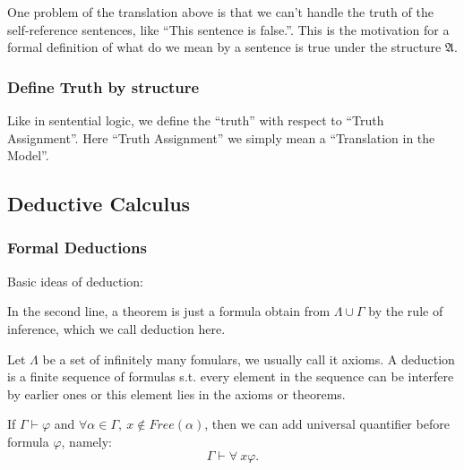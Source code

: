 \documentclass[11pt]{article}
\begin{document}
One problem of the translation above is that we can't handle the truth of the self-reference sentences, like ``This sentence is false.''. This is the motivation for a formal definition of what do we mean by a sentence is true under the structure \(\mathfrak{A}\).
\subsubsection{Define Truth by structure}
\label{sec:org4a3d5a2}
Like in sentential logic, we define the ``truth'' with respect to ``Truth Assignment''. Here ``Truth Assignment'' we simply mean a ``Translation in the Model''.
\subsection{Deductive Calculus}
\label{sec:org033c44d}
\subsubsection{Formal Deductions}
\label{sec:orgc68c25c}
Basic ideas of deduction:
\begin{center}\end{center}

In the second line, a theorem is just a formula obtain from \(\Lambda \cup \Gamma\) by the rule of inference, which we call deduction here.


\begin{definition}[Deduction]
Let \(\Lambda\) be a set of infinitely many fomulars, we usually call it axioms. A deduction is a finite sequence of formulas s.t. every element in the sequence can be interfere by earlier ones or this element lies in the axioms or theorems.
\end{definition}

\begin{theorem}
If \(\Gamma \vdash \varphi\) and \(\forall \alpha \in \Gamma, \ x \notin Free(\alpha)\), then we can add universal quantifier before formula \(\varphi\), namely:
\[
\Gamma \vdash \forall \ x \varphi.
\]
\end{theorem}
\end{document}

